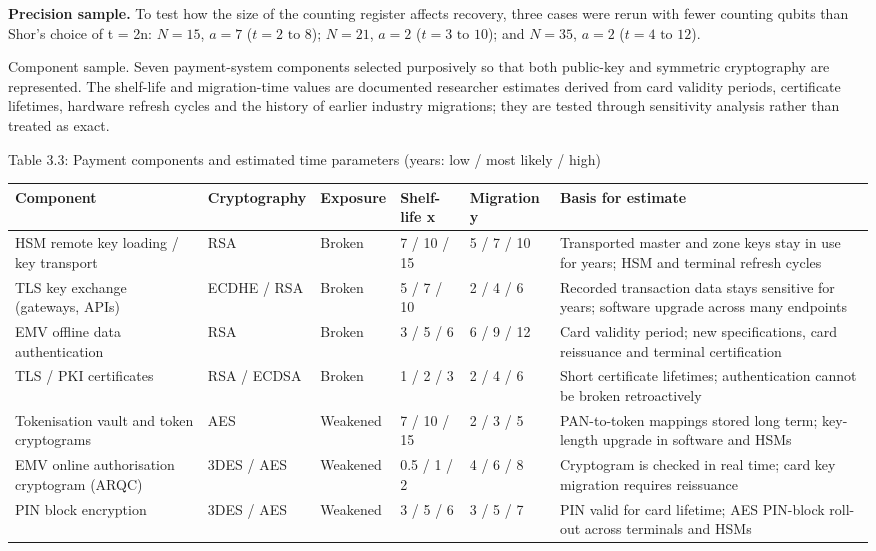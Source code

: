 \documentclass[12pt,oneside]{report}
\begin{document}
\textbf{Precision sample.} To test how the size of the counting register affects recovery, three cases were rerun with fewer counting qubits than Shor's choice of t = 2n: $N = 15$, $a = 7$ ($t = 2\text{ to }8$); $N = 21$, $a = 2$ ($t = 3\text{ to }10$); and $N = 35$, $a = 2$ ($t = 4\text{ to }12$).
\par

Component sample. Seven payment-system components selected purposively so that both public-key and symmetric cryptography are represented. The shelf-life and migration-time values are documented researcher estimates derived from card validity periods, certificate lifetimes, hardware refresh cycles and the history of earlier industry migrations; they are tested through sensitivity analysis rather than treated as exact.
\par

\label{tab:3.3}Table 3.3: Payment components and estimated time parameters (years: low / most likely / high)
\par

\begin{center}\footnotesize\begin{tabularx}{\textwidth}{|P{0.12\textwidth}|P{0.135\textwidth}|P{0.12\textwidth}|P{0.12\textwidth}|P{0.12\textwidth}|W|}\hline
Component & Cryptography & Exposure & Shelf-life x & Migration y & Basis for estimate \\\hline
HSM remote key loading / key transport & RSA & Broken & 7 / 10 / 15 & 5 / 7 / 10 & Transported master and zone keys stay in use for years; HSM and terminal refresh cycles \\\hline
TLS key exchange (gateways, APIs) & ECDHE / RSA & Broken & 5 / 7 / 10 & 2 / 4 / 6 & Recorded transaction data stays sensitive for years; software upgrade across many endpoints \\\hline
EMV offline data authentication & RSA & Broken & 3 / 5 / 6 & 6 / 9 / 12 & Card validity period; new specifications, card reissuance and terminal certification \\\hline
TLS / PKI certificates & RSA / ECDSA & Broken & 1 / 2 / 3 & 2 / 4 / 6 & Short certificate lifetimes; authentication cannot be broken retroactively \\\hline
Tokenisation vault and token cryptograms & AES & Weakened & 7 / 10 / 15 & 2 / 3 / 5 & PAN-to-token mappings stored long term; key-length upgrade in software and HSMs \\\hline
EMV online authorisation cryptogram (ARQC) & 3DES / AES & Weakened & 0.5 / 1 / 2 & 4 / 6 / 8 & Cryptogram is checked in real time; card key migration requires reissuance \\\hline
PIN block encryption & 3DES / AES & Weakened & 3 / 5 / 6 & 3 / 5 / 7 & PIN valid for card lifetime; AES PIN-block roll-out across terminals and HSMs \\\hline\end{tabularx}\end{center}
\end{document}
